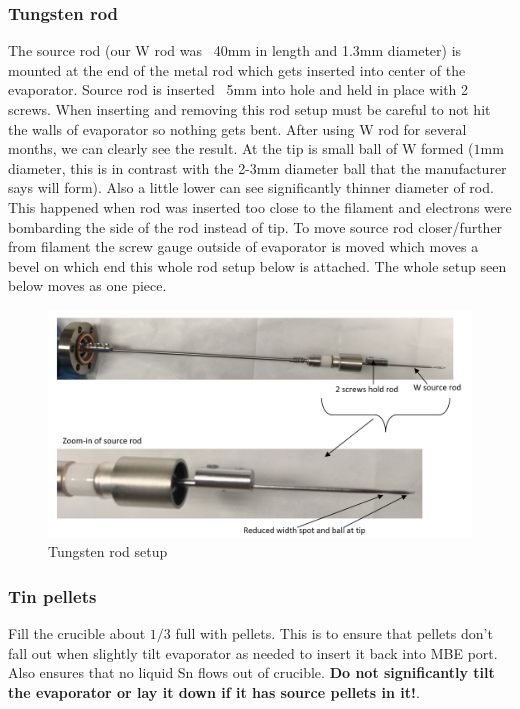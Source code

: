 \subsubsection*{Tungsten rod}
The source rod (our W rod was ~40mm in length and 1.3mm diameter) is mounted at the end of the metal rod which gets inserted into center of the evaporator. Source rod is inserted ~5mm into hole and held in place with 2 screws. When inserting and removing this rod setup must be careful to not hit the walls of evaporator so nothing gets bent. After using W rod for several months, we can clearly see the result. At the tip is small ball of W formed ($1$mm diameter, this is in contrast with the 2-3mm diameter ball that the manufacturer says will form). Also a little lower can see significantly thinner diameter of rod. This happened when rod was inserted too close to the filament and electrons were bombarding the side of the rod instead of tip.  To move source rod closer/further from filament the screw gauge outside of evaporator is moved which moves a bevel on which end this whole rod setup below is attached. The whole setup seen below moves as one piece.

\begin{figure}[H]
	\centering
	\includegraphics[width=1\textwidth]{W-rod-pics.png}  %
	\caption{Tungsten rod setup}
	\label{fig:W-evaporator}
\end{figure}


\subsubsection*{Tin pellets}
Fill the crucible about $1/3$ full with pellets. This is to ensure that pellets don't fall out when slightly tilt evaporator as needed to insert it back into MBE port. Also ensures that no liquid Sn flows out of crucible. \textbf{Do not significantly tilt the evaporator or lay it down if it has source pellets in it!}.
 
